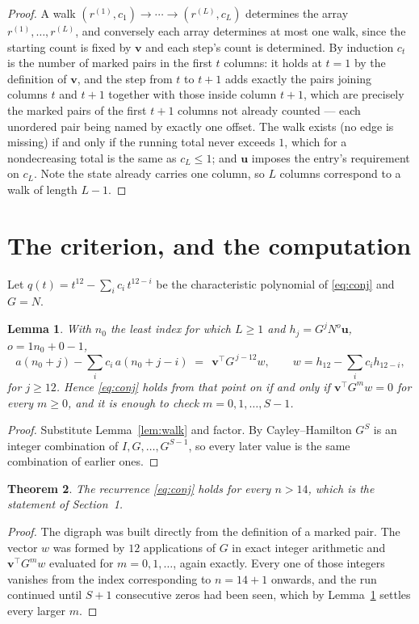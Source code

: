 \documentclass[11pt,a4paper]{article}
\theoremstyle{plain}
\newtheorem{theorem}{Theorem}
\newtheorem{lemma}[theorem]{Lemma}
\theoremstyle{definition}
\begin{document}
\begin{proof}
A walk $(r^{(1)},c_1)\to\cdots\to(r^{(L)},c_L)$ determines the array
$r^{(1)},\dots,r^{(L)}$, and conversely each array determines at most one walk, since the
starting count is fixed by $\mathbf{v}$ and each step's count is determined. By induction
$c_t$ is the number of marked pairs in the first $t$ columns: it holds at $t=1$ by the
definition of $\mathbf{v}$, and the step from $t$ to $t+1$ adds exactly the pairs joining
columns $t$ and $t+1$ together with those inside column $t+1$, which are precisely the marked
pairs of the first $t+1$ columns not already counted --- each unordered pair being named by
exactly one offset. The walk exists (no edge is missing) if and only if the running total
never exceeds $1$, which for a nondecreasing total is the same as $c_L\le1$; and
$\mathbf{u}$ imposes the entry's requirement on $c_L$. Note the state already carries one
column, so $L$ columns correspond to a walk of length $L-1$.
\end{proof}

\section{The criterion, and the computation}

Let $q(t)=t^{12}-\sum_i c_i\,t^{12-i}$ be the characteristic polynomial of
\eqref{eq:conj} and $G=N$.

\begin{lemma}\label{lem:crit}
With $n_0$ the least index for which $L\ge1$ and $h_j=G^{j}N^{o}\mathbf{u}$,
$o=1n_0+0-1$,
\[
a(n_0+j)-\sum_i c_i\,a(n_0+j-i)\;=\;\,\mathbf{v}^{\!\top}G^{\,j-12}w,
\qquad w=h_{12}-\sum_i c_i h_{12-i},
\]
for $j\ge12$. Hence \eqref{eq:conj} holds from that point on if and only if
$\mathbf{v}^{\!\top}G^{m}w=0$ for every $m\ge0$, and it is enough to check
$m=0,1,\dots,S-1$.
\end{lemma}

\begin{proof}
Substitute Lemma~\ref{lem:walk} and factor. By Cayley--Hamilton $G^{S}$ is an integer
combination of $I,G,\dots,G^{S-1}$, so every later value is the same combination of earlier
ones.
\end{proof}

\begin{theorem}
The recurrence \eqref{eq:conj} holds for every $n>14$, which is the statement of
Section~1.
\end{theorem}

\begin{proof}
The digraph was built directly from the definition of a marked pair. The vector $w$ was
formed by $12$ applications of $G$ in exact integer arithmetic and
$\mathbf{v}^{\!\top}G^{m}w$ evaluated for $m=0,1,\dots$, again exactly. Every one of
those integers vanishes from the index corresponding to $n=14+1$ onwards, and the run
continued until $S+1$ consecutive zeros had been seen, which by Lemma~\ref{lem:crit}
settles every larger $m$.
\end{proof}
\end{document}
